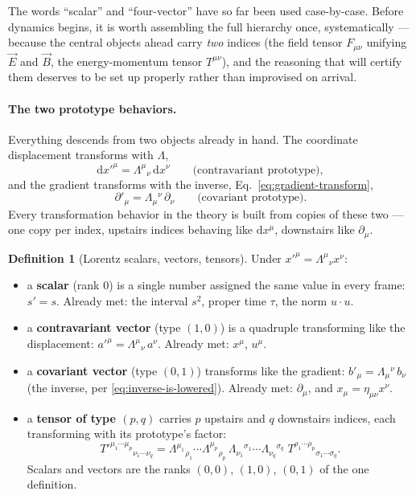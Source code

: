 \documentclass[11pt]{article}
\theoremstyle{plain}
\theoremstyle{definition}
\newtheorem{definition}[theorem]{Definition}
\theoremstyle{remark}
\newcommand{\dd}{\mathrm{d}}
\newcommand{\vE}{\vec{E}}
\newcommand{\vB}{\vec{B}}
\begin{document}
The words ``scalar'' and ``four-vector'' have so far been used
case-by-case. Before dynamics begins, it is worth assembling the full
hierarchy once, systematically --- because the central objects ahead
carry \emph{two} indices (the field tensor $F_{\mu\nu}$ unifying
$\vE$ and $\vB$, the energy-momentum tensor $T^{\mu\nu}$), and the
reasoning that will certify them deserves to be set up properly rather
than improvised on arrival.

\paragraph{The two prototype behaviors.} Everything descends from two
objects already in hand. The coordinate displacement transforms with
$\Lambda$,
\begin{equation}
  \dd x'^\mu = \Lambda^\mu{}_\nu\, \dd x^\nu
  \qquad\text{(contravariant prototype)},
\end{equation}
and the gradient transforms with the inverse,
Eq.~\eqref{eq:gradient-transform},
\begin{equation}
  \partial'_\mu = \Lambda_\mu{}^\nu\, \partial_\nu
  \qquad\text{(covariant prototype)}.
\end{equation}
Every transformation behavior in the theory is built from copies of
these two --- one copy per index, upstairs indices behaving like
$\dd x^\mu$, downstairs like $\partial_\mu$.

\begin{definition}[Lorentz scalars, vectors, tensors]
\label{def:tensor}
Under $x'^\mu = \Lambda^\mu{}_\nu x^\nu$:
\begin{itemize}
  \item a \textbf{scalar} (rank 0) is a single number assigned the same
  value in every frame: $s' = s$. Already met: the interval $s^2$,
  proper time $\tau$, the norm $u \cdot u$.
  \item a \textbf{contravariant vector} (type $(1,0)$) is a quadruple
  transforming like the displacement:
  $a'^\mu = \Lambda^\mu{}_\nu\, a^\nu$. Already met: $x^\mu$, $u^\mu$.
  \item a \textbf{covariant vector} (type $(0,1)$) transforms like the
  gradient:
  $b'_\mu = \Lambda_\mu{}^\nu\, b_\nu$ (the inverse, per
  \eqref{eq:inverse-is-lowered}). Already met:
  $\partial_\mu$, and $x_\mu = \eta_{\mu\nu}x^\nu$.
  \item a \textbf{tensor of type $(p,q)$} carries $p$ upstairs and $q$
  downstairs indices, each transforming with its prototype's factor:
  \begin{equation}
    T'^{\mu_1\cdots\mu_p}{}_{\nu_1\cdots\nu_q}
    = \Lambda^{\mu_1}{}_{\rho_1}\!\cdots\Lambda^{\mu_p}{}_{\rho_p}\,
      \Lambda_{\nu_1}{}^{\sigma_1}\!\cdots
      \Lambda_{\nu_q}{}^{\sigma_q}\;
      T^{\rho_1\cdots\rho_p}{}_{\sigma_1\cdots\sigma_q}.
    \label{eq:tensor-law}
  \end{equation}
  Scalars and vectors are the ranks $(0,0)$, $(1,0)$, $(0,1)$ of the
  one definition.
\end{itemize}
\end{definition}
\end{document}

